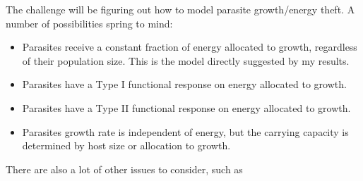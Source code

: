 \documentclass[12pt,reqno,final,pdftex]{amsart}\usepackage[]{graphicx}\usepackage[]{color}
\theoremstyle{plain}
\numberwithin{equation}{part}
\begin{document}
The challenge will be figuring out how to model parasite growth/energy theft. A number of possibilities spring to mind:
\begin{itemize}
\item Parasites receive a constant fraction of energy allocated to growth, regardless of their population size. This is the model directly suggested by my results.
\item Parasites have a Type I functional response on energy allocated to growth.
\item Parasites have a Type II functional response on energy allocated to growth.
\item Parasites growth rate is independent of energy, but the carrying capacity is determined by host size or allocation to growth.
\end{itemize}
There are also a lot of other issues to consider, such as
\end{document}
